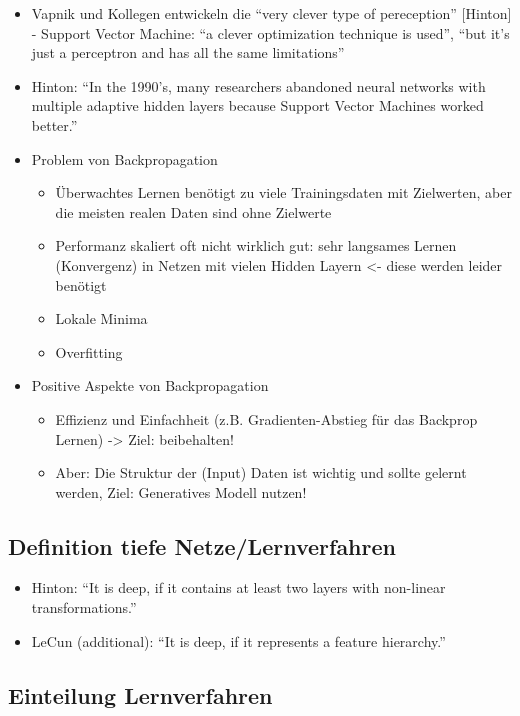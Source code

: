 \documentclass[paper=a4, fontsize=11pt]{scrartcl} %
\numberwithin{equation}{section} %
\numberwithin{figure}{section} %
\numberwithin{table}{section} %
\begin{document}
\begin{itemize}
\item Vapnik und Kollegen entwickeln die ``very clever type of pereception'' [Hinton] - Support Vector Machine: ``a clever optimization technique is used'', ``but it's just a perceptron and has all the same limitations''
\item Hinton: ``In the 1990's, many researchers abandoned neural networks with multiple adaptive hidden layers because Support Vector Machines worked better.''
\item Problem von Backpropagation
\begin{itemize}
\item Überwachtes Lernen benötigt zu viele Trainingsdaten mit Zielwerten, aber die meisten realen Daten sind ohne Zielwerte
\item Performanz skaliert oft nicht wirklich gut: sehr langsames Lernen (Konvergenz) in Netzen mit vielen Hidden Layern <- diese werden leider benötigt
\item Lokale Minima
\item Overfitting
\end{itemize}
\item Positive Aspekte von Backpropagation
\begin{itemize}
\item Effizienz und Einfachheit (z.B. Gradienten-Abstieg für das Backprop Lernen) -> Ziel: beibehalten!
\item Aber: Die Struktur der (Input) Daten ist wichtig und sollte gelernt werden, Ziel: Generatives Modell nutzen!
\end{itemize}
\end{itemize}

\subsection{Definition tiefe Netze/Lernverfahren}

\begin{itemize}
\item Hinton: ``It is deep, if it contains at least two layers with non-linear transformations.''
\item LeCun (additional): ``It is deep, if it represents a feature hierarchy.''
\end{itemize}

\subsection{Einteilung Lernverfahren}
\end{document}
